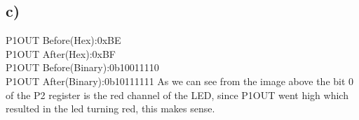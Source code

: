 \documentclass{article}
\begin{document}
\subsection*{c)}
\begin{center}
    P1OUT Before(Hex):0xBE\\
    P1OUT After(Hex):0xBF\\
    P1OUT Before(Binary):0b10011110\\
    P1OUT After(Binary):0b10111111
    \bigbreak
    \bigbreak
    As we can see from the image above the bit 0 of the P2 register is the red channel of the LED, since P1OUT went high which resulted in the led turning red, this makes sense.
\end{center}
\newpage
\end{document}

